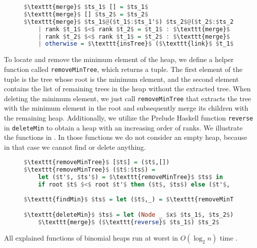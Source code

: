 \documentclass{clmthesis}
\begin{document}
\begin{figure}[h]
\begin{lstlisting}[mathescape=true, language=haskell, caption={Merge function.},captionpos=b, label=fig:Bmerge, abovecaptionskip=\bigskipamount]
$\texttt{merge}$ $ts_1$ [] = $ts_1$
$\texttt{merge}$ [] $ts_2$ = $ts_2$
$\texttt{merge}$ $ts_1$@($t_1$:$ts_1'$) $ts_2$@($t_2$:$ts_2'$)
	| rank $t_1$ $<$ rank $t_2$ = $t_1$ : $\texttt{merge}$ $ts_1'$ $ts_2$
	| rank $t_2$ $<$ rank $t_1$ = $t_2$ : $\texttt{merge}$ $ts_1$ $ts_2'$
	| otherwise = $\texttt{insTree}$ ($\texttt{link}$ $t_1$ $t_2$) ($\texttt{merge}$ $ts_1'$ $ts_2'$)
\end{lstlisting}
\end{figure}

To locate and remove the minimum element of the heap, we define a helper function called \texttt{removeMinTree}, which returns a tuple. The first element of the tuple is the tree whose root is the minimum element, and the second element contains the list of remaining trees in the heap without the extracted tree. When deleting the minimum element, we just call \texttt{removeMinTree} that extracts the tree with the minimum element in the root and subsequently merge its children with the remaining heap. Additionally, we utilize the Prelude Haskell function \texttt{reverse} in \texttt{deleteMin} to obtain a heap with an increasing order of ranks. We illustrate the functions in . In those functions we do not consider an empty heap, because in that case we cannot find or delete anything.

\begin{figure}[h]
\begin{lstlisting}[mathescape=true, language=haskell, caption={Find and delete minimum functions.},captionpos=b, label=fig:Bdelete ]
$\texttt{removeMinTree}$ [$t$] = ($t$,[])
$\texttt{removeMinTree}$ ($t$:$ts$) = 
	let ($t'$, $ts'$) = $\texttt{removeMinTree}$ $ts$ in
	if root $t$ $<$ root $t'$ then ($t$, $ts$) else ($t'$, $t$:$ts'$)
	
$\texttt{findMin}$ $ts$ = let ($t$,_) = $\texttt{removeMinTree}$ $ts$ in root $t$

$\texttt{deleteMin}$ $ts$ = let (Node _ $x$ $ts_1$, $ts_2$) = $\texttt{removeMinTree}$ $ts$ in
	$\texttt{merge}$ ($\texttt{reverse}$ $ts_1$) $ts_2$
\end{lstlisting}
\end{figure}

All explained functions of binomial heaps run at worst in $O(\log_2 n)$ time \cite{okasaki1999}. 
\end{document}
